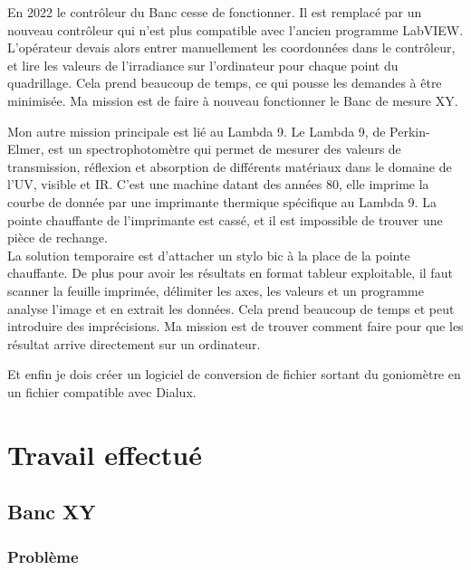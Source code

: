 \documentclass[12pt]{article}
\begin{document}
En 2022 le contrôleur du Banc cesse de fonctionner.
Il est remplacé par un nouveau contrôleur qui n'est plus compatible avec l'ancien programme LabVIEW.\\
L'opérateur devais alors entrer manuellement les coordonnées dans le contrôleur, et lire les valeurs de l'irradiance sur l'ordinateur pour chaque point du quadrillage.
Cela prend beaucoup de temps, ce qui pousse les demandes à être minimisée.
Ma mission est de faire à nouveau fonctionner le Banc de mesure XY.


Mon autre mission principale est lié au Lambda 9.
Le Lambda 9, de Perkin-Elmer, est un spectrophotomètre qui permet de mesurer des valeurs de transmission, réflexion et absorption de différents matériaux dans le domaine de l'UV, visible et IR.
C'est une machine datant des années 80, elle imprime la courbe de donnée par une imprimante thermique spécifique au Lambda 9.
La pointe chauffante de l'imprimante est cassé, et il est impossible de trouver une pièce de rechange.\\
La solution temporaire est d'attacher un stylo bic à la place de la pointe chauffante.
De plus pour avoir les résultats en format tableur exploitable, il faut scanner la feuille imprimée, délimiter les axes, les valeurs et un programme analyse l'image et en extrait les données.
Cela prend beaucoup de temps et peut introduire des imprécisions.
Ma mission est de trouver comment faire pour que les résultat arrive directement sur un ordinateur.



Et enfin je dois créer un logiciel de conversion de fichier sortant du goniomètre en un fichier compatible avec Dialux.
\newpage

\section{Travail effectué}

\subsection{Banc XY}

\subsubsection{Problème}
\end{document}

